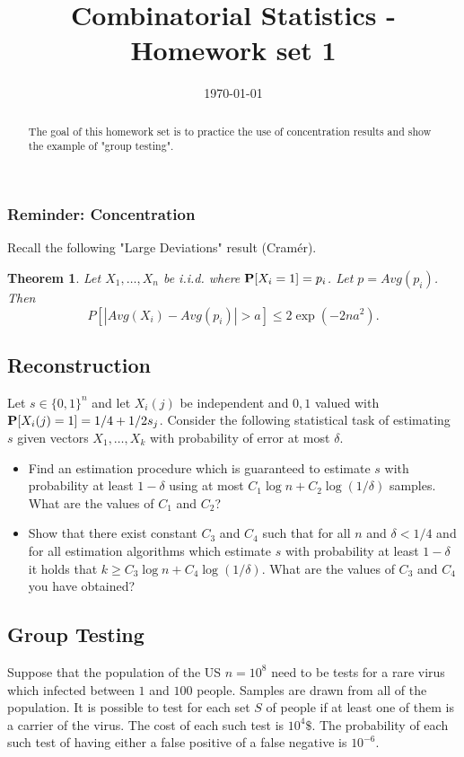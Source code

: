 \documentclass[11pt]{article} \usepackage{amssymb}
\newtheorem{theorem}{Theorem}[section]
\begin{document}
\title{Combinatorial Statistics - Homework set 1}

\date{\today}
\maketitle
\begin{abstract}
The goal of this homework set is to practice the use of concentration results and show the example of "group testing".
\end{abstract}

\subsubsection{Reminder: Concentration}
Recall the following "Large Deviations" result (Cram\'{e}r).
\begin{theorem}
Let $X_1,\ldots,X_n$ be i.i.d. where $\P[X_i = 1] = p_i$. Let $p = Avg(p_i)$. Then
\[
P[|Avg(X_i) - Avg(p_i)| > a] \leq 2 \exp(-2n a^2).
\]
\end{theorem}

\subsection{Reconstruction}
Let $s \in \{0,1\}^n$ and let $X_i(j)$ be independent and $0,1$ valued with $\P[X_i(j) = 1] = 1/4 + 1/2 s_j$. 
Consider the following statistical task of estimating $s$ given vectors $X_1,\ldots,X_k$ with probability of error at most $\delta$.
\begin{itemize}
\item
Find an estimation procedure which is guaranteed to estimate $s$ with probability at least $1-\delta$ using at most 
$C_1 \log n + C_2 \log (1/\delta)$ samples. What are the values of $C_1$ and $C_2$?  
\item
Show that there exist constant $C_3$ and $C_4$ such that for all $n$ and $\delta < 1/4$ and for all estimation algorithms 
which estimate $s$ with probability at least $1-\delta$ it holds that $k \geq C_3 \log n + C_4 \log (1/\delta)$. 
What are the values of $C_3$ and $C_4$ you have obtained? 
\end{itemize}

\subsection{Group Testing}
Suppose that the population of the US $n=10^8$ need to be tests for a rare virus which infected between $1$ and $100$ people. 
Samples are drawn from all of the population. It is possible to test for each set $S$ of people if at least one of them 
is a carrier of the virus. The cost of each such test is $10^4\$$. The probability of each such test of having either a false positive of a false negative is $10^{-6}$. 
\end{document}
